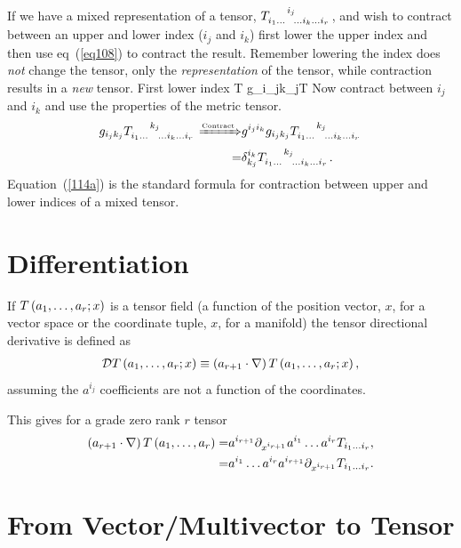 If we have a mixed representation of a tensor, $T\indices{_{i_{1}\dots}^{i_{j}}_{\dots i_{k}\dots i_{r}}}$, 
and wish to contract between an upper and lower index ($i_{j}$ and $i_{k}$) first lower the upper index and then use eq~(\ref{eq108})
to contract the result.  Remember lowering the index does \emph{not} change the tensor, only the \emph{representation} of the tensor,
while contraction results in a \emph{new} tensor.  First lower index
\be
	T  g_{i_{j}k_{j}}T	
\ee
Now contract between $i_{j}$ and $i_{k}$ and use the properties of the metric tensor.
\begin{align}
	g_{i_{j}k_{j}}T\indices{_{i_{1}\dots}^{k_{j}}_{\dots i_{k}\dots i_{r}}} \xRightarrow{\mbox{\tiny Contract}}&
				g^{i_{j}i_{k}}g_{i_{j}k_{j}}T\indices{_{i_{1}\dots}^{k_{j}}_{\dots i_{k}\dots i_{r}}} \nonumber \\
				=& \delta_{k_{j}}^{i_{k}}T\indices{_{i_{1}\dots}^{k_{j}}_{\dots i_{k}\dots i_{r}}}. \label{114a}
\end{align}
Equation~(\ref{114a}) is the standard formula for contraction between upper and lower indices of a mixed tensor.

\section{Differentiation}
If ${T}\left ( {a_{1},\dots,a_{r};x} \right )$ is a tensor field (a function of the position vector, $x$, for a vector space or the coordinate
tuple, $x$, for a manifold) the tensor directional derivative is defined as
\begin{align}
	\mathcal{D}{T}\left ( {a_{1},\dots,a_{r};x} \right ) \equiv \left ( a_{r+1}\cdot\nabla\right ){T}\left ( {a_{1},\dots,a_{r};x} \right ),
\end{align}
assuming the $a^{i_{j}}$ coefficients are not a function of the coordinates.

This gives for a grade zero rank $r$ tensor
\begin{align}
	\left ( a_{r+1}\cdot\nabla\right ){T}\left ( {a_{1},\dots,a_{r}} \right ) =& a^{i_{r+1}}\partial_{x^{i_{r+1}}}a^{i_{1}}\dots a^{i_{r}}
													    T_{i_{1}\dots i_{r}}, \nonumber \\
													 =& a^{i_{1}}\dots a^{i_{r}}a^{i_{r+1}}
													    \partial_{x^{i_{r+1}}}T_{i_{1}\dots i_{r}}. 
\end{align}

\section{From Vector/Multivector to Tensor}


